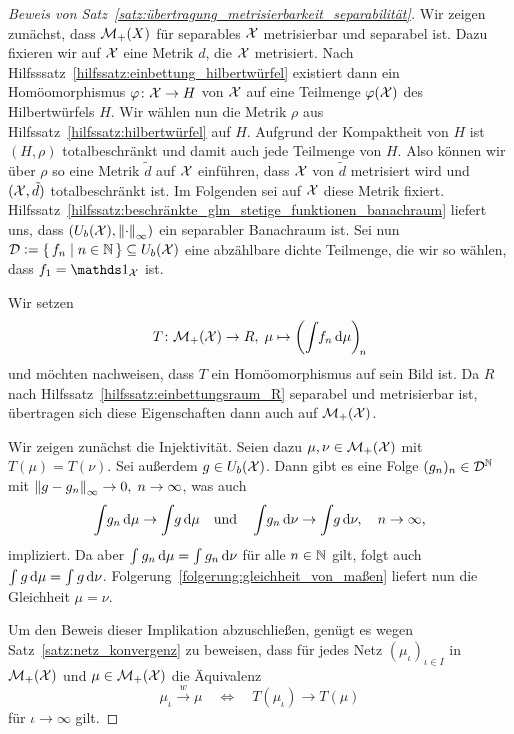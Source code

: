 \documentclass[../thesis/thesis.tex]{subfiles}
\begin{document}
	\begin{proof}[Beweis von Satz~\ref{satz:übertragung_metrisierbarkeit_separabilität}]
		Wir zeigen zunächst, dass $\mathcal{M}_{+}(X)$ für separables $\mathcal{X}$ metrisierbar und separabel ist. Dazu fixieren wir auf $\mathcal{X}$ eine Metrik $d$, die $\mathcal{X}$ metrisiert. 
		Nach Hilfsssatz~\ref{hilfssatz:einbettung_hilbertwürfel} existiert dann ein Homöomorphismus $\varphi \colon \mathcal{X} \to H$ von
		$\mathcal{X}$ auf eine Teilmenge $\varphi(\mathcal{X})$ des Hilbertwürfels $H$. Wir wählen nun die Metrik $\rho$ aus Hilfssatz~\ref{hilfssatz:hilbertwürfel} auf $H$. Aufgrund der Kompaktheit von $H$ ist
		$(H, \rho)$ totalbeschränkt und damit auch jede Teilmenge von $H$. Also können wir über $\rho$ so eine Metrik $\tilde{d}$ auf $\mathcal{X}$ einführen, dass $\mathcal{X}$ von $\tilde{d}$ 
		metrisiert wird und $(\mathcal{X}, \tilde{d})$ totalbeschränkt ist. Im Folgenden sei auf $\mathcal{X}$ diese Metrik fixiert. Hilfssatz~\ref{hilfssatz:beschränkte_glm_stetige_funktionen_banachraum} liefert uns, dass 
		$(U_b(\mathcal{X}), \left\lVert\cdot\right\rVert_\infty)$ ein separabler Banachraum ist. Sei nun $\mathcal{D} \vcentcolon = \left\{\, f_n \; \middle| \; n \in \mathbb{N} \,\right\} \subseteq U_b(\mathcal{X})$ eine abzählbare dichte Teilmenge, 
		die wir so wählen, dass $f_1 = \indfct_\X$ ist.
		
		Wir setzen
		\[ T \colon \mathcal{M}_{+}(\mathcal{X}) \to R, \; \mu \mapsto \left( \int_{} \, f_n \, \mathrm{d}\mu \right)_{\! n}  \]
		und möchten nachweisen, dass $T$ ein Homöomorphismus auf sein Bild ist. Da $R$ nach Hilfssatz~\ref{hilfssatz:einbettungsraum_R} separabel und metrisierbar ist, übertragen sich diese Eigenschaften dann auch auf $\mathcal{M}_{+}(\mathcal{X})$.
		
		Wir zeigen zunächst die Injektivität. Seien dazu $\mu, \nu \in \mathcal{M}_{+}(\mathcal{X})$ mit $T(\mu) = T(\nu)$. 
		Sei außerdem $g \in U_b(\mathcal{X})$. Dann gibt es eine Folge $(g_n)_n \in \mathcal{D}^{\mathbb{N}}$ mit $\left\lVert g - g_n\right\rVert_\infty \to 0, \; n \to \infty$, was auch 
		\[ \int_{} \, g_n \, \mathrm{d}\mu \to \int_{} \, g \, \mathrm{d}\mu \quad \text{und} \quad \int_{} \, g_n \, \mathrm{d}\nu \to \int_{} \, g \, \mathrm{d}\nu, \quad n \to \infty \text{,} \]
		impliziert. Da aber $\int_{} \, g_n \, \mathrm{d}\mu = \int_{} \, g_n \, \mathrm{d}\nu$ für alle $n \in \mathbb{N}$ gilt, folgt auch $\int_{} \, g \, \mathrm{d}\mu = \int_{} \, g \, \mathrm{d}\nu$.
		Folgerung~\ref{folgerung:gleichheit_von_maßen} liefert nun die Gleichheit $\mu = \nu$.
		
		Um den Beweis dieser Implikation abzuschließen, genügt es wegen Satz~\ref{satz:netz_konvergenz} zu beweisen, dass für jedes Netz $(\mu_\iota)_{\iota \in I}$ in $\mathcal{M}_{+}(\mathcal{X})$ und $\mu \in \mathcal{M}_{+}(\mathcal{X})$ die
		Äquivalenz
		\[ \mu_\iota \xrightarrow{w} \mu \quad \iff \quad T(\mu_\iota) \to T(\mu)  \]
		für $\iota \to \infty$ gilt.
		

\end{proof}
\end{document}
